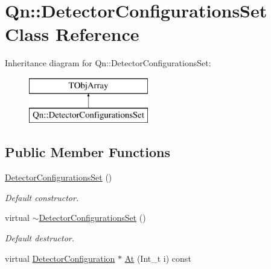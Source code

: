 \hypertarget{classQn_1_1DetectorConfigurationsSet}{}\section{Qn\+:\+:Detector\+Configurations\+Set Class Reference}
\label{classQn_1_1DetectorConfigurationsSet}
Inheritance diagram for Qn\+:\+:Detector\+Configurations\+Set\+:\begin{figure}[H]
\begin{center}
\leavevmode
\includegraphics[height=2.000000cm]{classQn_1_1DetectorConfigurationsSet}
\end{center}
\end{figure}
\subsection*{Public Member Functions}
\begin{DoxyCompactItemize}
\item 
\mbox{\label{classQn_1_1DetectorConfigurationsSet_a586fc43387363a6c2672369968241b0f}} 
\mbox{\hyperlink{classQn_1_1DetectorConfigurationsSet_a586fc43387363a6c2672369968241b0f}{Detector\+Configurations\+Set}} ()
\begin{DoxyCompactList}\small\item\em Default constructor. \end{DoxyCompactList}\item 
\mbox{\label{classQn_1_1DetectorConfigurationsSet_af038bf7441528067a130e68a995ff03d}} 
virtual \mbox{\hyperlink{classQn_1_1DetectorConfigurationsSet_af038bf7441528067a130e68a995ff03d}{$\sim$\+Detector\+Configurations\+Set}} ()
\begin{DoxyCompactList}\small\item\em Default destructor. \end{DoxyCompactList}\item 
virtual \mbox{\hyperlink{classQn_1_1DetectorConfiguration}{Detector\+Configuration}} $\ast$ \mbox{\hyperlink{classQn_1_1DetectorConfigurationsSet_ac9f2135ccb4de759e8d870b5eaeca96a}{At}} (Int\+\_\+t i) const
\end{DoxyCompactItemize}


